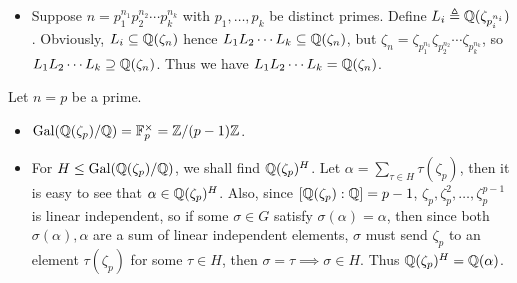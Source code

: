 \begin{prop}
\begin{itemize}
      \begin{proof}
        Let $\sigma_k = (\zeta_n \mapsto \zeta_n^k) \in \Gal(\Qb(\zeta_n) / \Qb)$.
        The isomorphism is given by $\sigma_k \mapsto \bar{k}$.
        Clearly, it is a homomorphism since $\sigma_k \sigma_h = (\zeta_n \mapsto \zeta_n^{kh}) = \sigma_{kh}$.
        Also $\sigma_k = 1 \iff \bar{k} = 1$. Finally, $\abs{\Gal(\Qb(\zeta_n) / \Qb)} = \abs{\Fb_n^\times} = \varphi(n)$,
        so the map is onto.
      \end{proof}
    \item Suppose $n = p_1^{n_1} p_2^{n_2} \cdots p_k^{n_k}$ with $p_1, \dots, p_k$ be distinct primes.
      Define $L_i \triangleq \mathbb{Q}(\zeta_{p_i^{n_i}})$. Obviously, $L_i \subseteq \mathbb{Q}(\zeta_n)$ hence
      $L_1 L_2 \dotsm L_k \subseteq \mathbb{Q}(\zeta_n)$, but $\zeta_n = \zeta_{p_1^{n_1}} \zeta_{p_2^{n_2}}
      \dotsm \zeta_{p_k^{n_k}}$, so $L_1 L_2 \dotsm L_k \supseteq \mathbb{Q}(\zeta_n)$. Thus we have
      $L_1 L_2 \dotsm L_k = \mathbb{Q}(\zeta_n)$.
  \end{itemize}
\end{prop}

\begin{example}
  Let $n = p$ be a prime.
  \begin{itemize}
    \item $\operatorname{Gal}(\mathbb{Q}(\zeta_p) / \mathbb{Q}) = \mathbb{F}_p^\times = \mathbb{Z} / (p-1)\mathbb{Z}$.
    \item For $H \leq \operatorname{Gal}(\mathbb{Q}(\zeta_p) / \mathbb{Q})$, we shall find $\mathbb{Q}(\zeta_p)^H$.
      Let $\alpha = \sum_{\tau \in H} \tau(\zeta_p)$, then it is easy to
      see that $\alpha \in \mathbb{Q}(\zeta_p)^H$. Also, since $[\mathbb{Q}(\zeta_p): \mathbb{Q}] = p-1$,
      $\zeta_p, \zeta_p^2, \dots, \zeta_p^{p-1}$ is linear independent,
      so if some $\sigma \in G$ satisfy $\sigma(\alpha) = \alpha$, then since
      both $\sigma(\alpha), \alpha$ are a sum of linear independent elements,
      $\sigma$ must send $\zeta_p$ to an element $\tau(\zeta_p)$ for some $\tau \in H$,
      then $\sigma = \tau \implies \sigma \in H$. Thus $\mathbb{Q}(\zeta_p)^H = \mathbb{Q}(\alpha)$.

  \end{itemize}
\end{example}
\begin{example}
\end{example}

